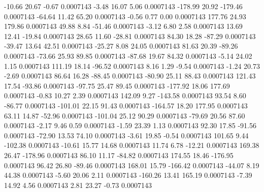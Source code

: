       -10.66       20.67       -0.67     0.0007143
       -3.48       16.07        5.06     0.0007143
     -178.99       20.92     -179.46     0.0007143
      -64.64       11.42       65.20     0.0007143
       -0.56        0.77        0.00     0.0007143
      177.76       24.93      179.86     0.0007143
       49.88        8.84      -51.46     0.0007143
       -3.12        6.80        2.58     0.0007143
       13.69       12.41      -19.84     0.0007143
       28.65       11.60      -28.81     0.0007143
       84.30       18.28      -87.29     0.0007143
      -39.47       13.64       42.51     0.0007143
      -25.27        8.08       24.05     0.0007143
       81.63       20.39      -89.26     0.0007143
      -73.66       25.93       89.85     0.0007143
      -87.68       19.67       84.32     0.0007143
       -5.14       24.02        1.15     0.0007143
      111.19       18.14      -96.52     0.0007143
        8.16        1.29       -9.54     0.0007143
       -1.24       20.73       -2.69     0.0007143
       86.64       16.28      -88.45     0.0007143
      -80.90       25.11       88.43     0.0007143
      121.43       17.54      -93.86     0.0007143
      -97.75       25.47       89.45     0.0007143
     -177.92       18.06      177.69     0.0007143
       -0.83       10.27        2.39     0.0007143
      142.09        9.27     -143.58     0.0007143
       93.54        8.60      -86.77     0.0007143
     -101.01       22.15       91.43     0.0007143
     -164.57       18.20      177.95     0.0007143
       63.11       14.87      -52.96     0.0007143
     -101.04       25.12       90.29     0.0007143
      -79.69       20.56       87.60     0.0007143
       -2.17        9.46        0.59     0.0007143
       -1.59       23.39        1.13     0.0007143
       92.30       17.85      -91.56     0.0007143
      -72.90       13.53       74.10     0.0007143
       -3.61       19.85       -0.54     0.0007143
      101.65        9.44     -102.38     0.0007143
      -10.61       15.77       14.68     0.0007143
       11.74        6.78      -12.21     0.0007143
      169.38       26.47     -178.96     0.0007143
       86.10       11.17      -84.82     0.0007143
      174.55       18.46     -176.95     0.0007143
       96.42       26.80      -89.46     0.0007143
      168.01       15.79     -166.42     0.0007143
      -44.07        8.19       44.38     0.0007143
       -5.60       20.06        2.11     0.0007143
     -160.26       13.41      165.19     0.0007143
       -7.39       14.92        4.56     0.0007143
        2.81       23.27       -0.73     0.0007143
